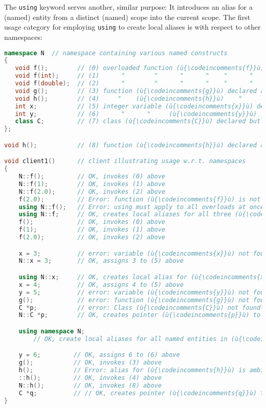 The \texttt{using} keyword serves another, similar purpose: It introduces an
alias for a (named) entity from a distinct (named) scope into the
current scope. The first usage category for employing \texttt{using} to
create local aliases is with respect to other namespaces:

\begin{lstlisting}[language=C++]
namespace N  // namespace containing various named constructs
{
   void f();        // (0) overloaded function (ù{\codeincomments{f}}ù) declared at namespace scope
   void f(int);     // (1)      "        "      "      "    "      "       "
   void f(double);  // (2)      "        "      "      "    "      "       "
   void g();        // (3) function (ù{\codeincomments{g}}ù) declared at namespace scope
   void h();        // (4)     "    (ù{\codeincomments{h}}ù)    "      "     "       "
   int x;           // (5) integer variable (ù{\codeincomments{x}}ù) declared at namespace scope
   int y;           // (6)      "      "     (ù{\codeincomments{y}}ù)     "     "     "      "
   class C;         // (7) class (ù{\codeincomments{C}}ù) declared but not defined at namespace scope
};

void h();           // (8) function (ù{\codeincomments{h}}ù) declared at file (aka global) scope

void client1()      // client illustrating usage w.r.t. namespaces
{
    N::f();         // OK, invokes (0) above
    N::f(1);        // OK, invokes (1) above
    N::f(2.0);      // OK, invokes (2) above
    f(2.0);         // Error: function (ù{\codeincomments{f}}ù) is not found.
    using N::f();   // Error: using must apply to all overloads at once.
    using N::f;     // OK, creates local aliases for all three (ù{\codeincomments{f}}ù) overloads
    f();            // OK, invokes (0) above
    f(1);           // OK, invokes (1) above
    f(2.0);         // OK, invokes (2) above

    x = 3;          // error: variable (ù{\codeincomments{x}}ù) not found
    N::x = 3;       // OK, assigns 3 to (5) above

    using N::x;     // OK, creates local alias for (ù{\codeincomments{x}}ù)
    x = 4;          // OK, assigns 4 to (5) above
    y = 5;          // error: variable (ù{\codeincomments{y}}ù) not found
    g();            // error: function (ù{\codeincomments{g}}ù) not found
    C *p;           // error: Class (ù{\codeincomments{C}}ù) not found
    N::C *p;        // OK, creates pointer (ù{\codeincomments{p}}ù) to incomplete type (ù{\codeincomments{C}}ù) (8) above

    using namespace N;
        // OK, create local aliases for all named entities in (ù{\codeincomments{namespace}}ù) (ù{\codeincomments{N}}ù).

    y = 6;         // OK, assigns 6 to (6) above
    g();           // OK, invokes (3) above
    h();           // Error: alias for (ù{\codeincomments{h}}ù) is ambiguous; (4) or (8) above.
    ::h();         // OK, invokes (4) above
    N::h();        // OK, invokes (8) above
    C *q;          // // OK, creates pointer (ù{\codeincomments{q}}ù) to incomplete type (ù{\codeincomments{C}}ù) (8) above
}
\end{lstlisting}
    
